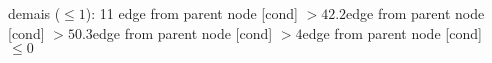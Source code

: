 {{{{{%
demais ($\leq 1$): 11} edge from parent node [cond] {$>42.2$}}edge from parent node [cond] {$>50.3$}}edge from parent node [cond] {$>4$}}edge from parent node [cond] {$\leq0$}}
